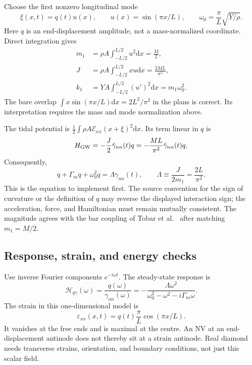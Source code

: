 \documentclass[a4paper,11pt]{article}
\newcommand{\dd}{\mathrm{d}}
\newcommand{\calE}{\mathcal E}
\newcommand{\eps}{\varepsilon}
\begin{document}
Choose the first nonzero longitudinal mode
\begin{equation}
 \xi(x,t)=q(t)u(x),\qquad u(x)=\sin(\pi x/L),\qquad
 \omega_0=\frac{\pi}{L}\sqrt{Y/\rho}.
\end{equation}
Here $q$ is an end-displacement amplitude, not a mass-normalized coordinate. Direct integration gives
\begin{align}
 m_1&=\rho A\int_{-L/2}^{L/2}u^2\dd x=\frac M2,\label{eq:mass}\\
 J&=\rho A\int_{-L/2}^{L/2}xu\dd x=\frac{2ML}{\pi^2},\label{eq:J}\\
 k_1&=YA\int_{-L/2}^{L/2}(u')^2\dd x=m_1\omega_0^2.
\end{align}
The bare overlap $\int x\sin(\pi x/L)\dd x=2L^2/\pi^2$ in the plans is correct. Its interpretation requires the mass and mode normalization above.

The tidal potential is $\frac12\int\rho A\calE_{xx}(x+\xi)^2\dd x$. Its term linear in $q$ is
\begin{equation}
 H_{\rm GW}=-\frac J2\ddot\gamma_{nn}(t)q=-\frac{ML}{\pi^2}\ddot\gamma_{nn}(t)q.
 \label{eq:Hbar}
\end{equation}
Consequently,
\begin{equation}
 \boxed{\ddot q+\Gamma_m\dot q+\omega_0^2q
 =\Lambda\ddot\gamma_{nn}(t),\qquad
 \Lambda\equiv\frac{J}{2m_1}=\frac{2L}{\pi^2}.}
 \label{eq:mode}
\end{equation}
This is the equation to implement first. The source convention for the sign of curvature or the definition of $q$ may reverse the displayed interaction sign; the acceleration, force, and Hamiltonian must remain mutually consistent. The magnitude agrees with the bar coupling of Tobar et al.~\cite{tobar} after matching $m_1=M/2$.

\subsection{Response, strain, and energy checks}

Use inverse Fourier components $e^{-i\omega t}$. The steady-state response is
\begin{equation}
 \mathcal H_{q\gamma}(\omega)=\frac{q(\omega)}{\gamma_{nn}(\omega)}
 =-\frac{\Lambda\omega^2}{\omega_0^2-\omega^2-i\Gamma_m\omega}.
 \label{eq:transfer}
\end{equation}
The strain in this one-dimensional model is
\begin{equation}
 \eps_{xx}(x,t)=q(t)\frac\pi L\cos(\pi x/L).
 \label{eq:localstrain}
\end{equation}
It vanishes at the free ends and is maximal at the centre. An NV at an end-displacement antinode does not thereby sit at a strain antinode. Real diamond needs transverse strains, orientation, and boundary conditions, not just this scalar field.
\end{document}

